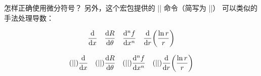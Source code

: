 \begin{myQA}{怎样正确使用微分符号？}
	另外，这个宏包提供的 \code|\derivative| 命令（简写为 \code|\dv|）
	可以类似的手法处理导数：
\begin{myExampleH}
{
\begin{equation*}
\dv{x} \quad \dv{R}{\theta} \quad \dv[n]{f}{x} \quad
\dv{r}(\frac{\ln r}{r})
\end{equation*}
}
\usepackage{physics}
\begin{equation*}
(|{ {} {} {} }|)\dv{x} \quad
(|{ {} {} {} }|)\dv{R}{\theta} \quad
(|{ {} {} {} }|)\dv[n]{f}{x} \quad
(|{ {} {} {} }|)\dv{r}(\frac{\ln r}{r})
\end{equation*}
\end{myExampleH}
	
\end{myQA}
